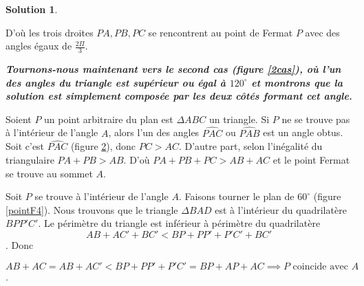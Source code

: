 \documentclass[10pt,a4paper]{article}%
\theoremstyle{theorem}
\theoremstyle{definition}
\newtheorem*{solution*}{Solution}
\begin{document}
\begin{solution*}
\begin{figure}[h]
\begin{center}
\begin{tikzpicture}
	        	\end{tikzpicture}
	        \end{center}
        	\caption{}\label{gamma}
	        \end{figure}
        
	        D'où les trois droites $PA,PB,PC$ se rencontrent au point de Fermat $P$ avec des angles égaux de $\frac{2\Pi}{3}$.
	        
	        
	        \textbf{\textit{Tournons-nous maintenant vers le second cas (figure \ref{2cas}), où l'un des angles du triangle est supérieur ou égal à $120^\circ$ et montrons que la solution est simplement composée par les deux côtés formant cet angle.}}
	        
	        Soient $P$ un point arbitraire du plan est $\Delta ABC$ un triangle. Si $P$ ne se trouve pas à l'intérieur de l'angle $A$, alors l'un des angles $\widehat{PAC}$ ou $\widehat{PAB}$ est un angle obtus. Soit c'est $\widehat{PAC}$ (figure \ref{pointF3}), donc $PC>AC$. D'autre part, selon l'inégalité du triangulaire $PA+PB>AB$. D'où $PA+PB+PC>AB+AC$ et le point Fermat se trouve au sommet $A$.
	        
	        \begin{figure}[h]
	        	\begin{center}
	        \end{center}
        	\caption{}\label{pointF3}
	        \end{figure}
        
	        Soit $P$ se trouve à l'intérieur de l'angle $A$. Faisons tourner le plan de $60^\circ$ (figure \ref{pointF4}). Nous trouvons que le triangle $\Delta BAD$ est à l'intérieur du quadrilatère $BPP'C'$. Le périmètre du triangle est inférieur à périmètre du quadrilatère 
	        \[AB+AC'+BC'<BP+PP'+P'C'+BC'\].
	        Donc 
	        
	        \[AB+AC=AB+AC'<BP+PP'+P'C'=BP+AP+AC \implies P \text{ coincide avec } A\].
	        

\end{solution*}
\end{document}
